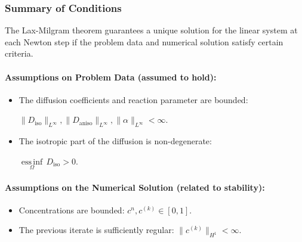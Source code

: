 \documentclass[12pt, a4paper, twoside, openright]{report}
\begin{document}
\subsubsection{Summary of Conditions}
The Lax-Milgram theorem guarantees a unique solution for the linear system at each Newton step if the problem data and numerical solution satisfy certain criteria.

\paragraph{Assumptions on Problem Data (assumed to hold):}
\begin{itemize}
    \item The diffusion coefficients and reaction parameter are bounded: 
    
    $\|D_{\text{iso}}\|_{L^\infty}, \|D_{\text{aniso}}\|_{L^\infty}, \|\alpha\|_{L^\infty} < \infty$.
    \item The isotropic part of the diffusion is non-degenerate: 
    
    $\underset{\Omega}{\operatorname{ess\,inf}} \, D_{\text{iso}} > 0$.
\end{itemize}

\paragraph{Assumptions on the Numerical Solution (related to stability):}
\begin{itemize}
    \item Concentrations are bounded: $c^n, c^{(k)} \in [0,1]$.
    \item The previous iterate is sufficiently regular: $\|c^{(k)}\|_{H^1} < \infty$.
\end{itemize}
\end{document}
